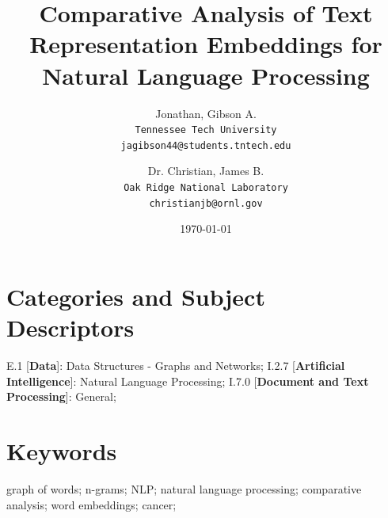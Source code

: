 \documentclass[twoside,twocolumn]{article}
\title{Comparative Analysis of Text Representation Embeddings for\\ Natural Language Processing} %
\author{
 Jonathan, Gibson A.\\ 
  \texttt{Tennessee Tech University}\\
  \texttt{jagibson44@students.tntech.edu}
  \and
  Dr. Christian, James B.\\
  \texttt{Oak Ridge National Laboratory}\\
  \texttt{christianjb@ornl.gov}
}
\date{\today}
\begin{document}
\maketitle
\thispagestyle{empty}


\section*{Categories and Subject \\Descriptors}

E.1 [\textbf{Data}]: Data Structures - Graphs and Networks;
I.2.7 [\textbf{Artificial Intelligence}]: Natural Language Processing;
I.7.0 [\textbf{Document and Text Processing}]: General;


\section*{Keywords}
graph of words; n-grams; NLP; natural language processing; comparative analysis; word embeddings; cancer;


\end{document}
